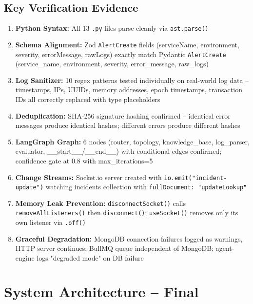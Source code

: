 \documentclass[11pt,a4paper]{article}
\begin{document}
\subsection{Key Verification Evidence}

\begin{enumerate}[leftmargin=*,itemsep=4pt]
  \item \textbf{Python Syntax:} All 13 \texttt{.py} files parse cleanly via \texttt{ast.parse()}
  \item \textbf{Schema Alignment:} Zod \texttt{AlertCreate} fields (serviceName, environment, severity, errorMessage, rawLogs) exactly match Pydantic \texttt{AlertCreate} (service\_name, environment, severity, error\_message, raw\_logs)
  \item \textbf{Log Sanitizer:} 10 regex patterns tested individually on real-world log data -- timestamps, IPs, UUIDs, memory addresses, epoch timestamps, transaction IDs all correctly replaced with type placeholders
  \item \textbf{Deduplication:} SHA-256 signature hashing confirmed -- identical error messages produce identical hashes; different errors produce different hashes
  \item \textbf{LangGraph Graph:} 6 nodes (router, topology, knowledge\_base, log\_parser, evaluator, \_\_start\_\_/\_\_end\_\_) with conditional edges confirmed; confidence gate at 0.8 with max\_iterations=5
  \item \textbf{Change Streams:} Socket.io server created with \texttt{io.emit("incident-update")} watching incidents collection with \texttt{fullDocument: "updateLookup"}
  \item \textbf{Memory Leak Prevention:} \texttt{disconnectSocket()} calls \texttt{removeAllListeners()} then \texttt{disconnect()}; \texttt{useSocket()} removes only its own listener via \texttt{.off()}
  \item \textbf{Graceful Degradation:} MongoDB connection failures logged as warnings, HTTP server continues; BullMQ queue independent of MongoDB; agent-engine logs "degraded mode" on DB failure
\end{enumerate}

\section{System Architecture -- Final}
\end{document}
